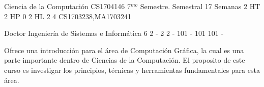\documentclass[a4paper,8pt]{article}
\begin{document}
\setNombreProfesor{}
\setGradoProfesorAbreviado{}
\sylabusHeader

\academicaTable
{Ciencia de la Computación} %
{CS1704146} %
{7$^{mo}$ Semestre.} %
{Semestral} %
{17 Semanas} %
{2 HT} %
{2 HP} %
{0} %
{2 HL}  %
{2} %
{4} %
{CS1703238,MA1703241} %

\administrativaTable
{Doctor} %
{Ingeniería de Sistemas e Informática} %
{6} %
{2} %
{-} %
{2} %
{2} %
{-} %
{101} %
{-} %
{101} %
{101} %
{-} %


\begin{fundamentacion}
Ofrece una introducción para el área de Computación Gráfica, la cual es una parte importante dentro de Ciencias de la
Computación. El proposito de este curso es investigar los principios, técnicas y herramientas fundamentales para esta área.

\end{fundamentacion}

\begin{sumilla}
\item \GVFundamentalConcepts
\item \GVBasicRendering
\item \HCIProgrammingInteractiveSystems
\item \GVGeometricModeling
\item \GVAdvancedRendering
\item \GVComputerAnimation

\end{sumilla}

\begin{competenciasAsignatura}
\item {}
\item {}
\item {}
\item {}
\item {}

\end{competenciasAsignatura}
\end{document}
